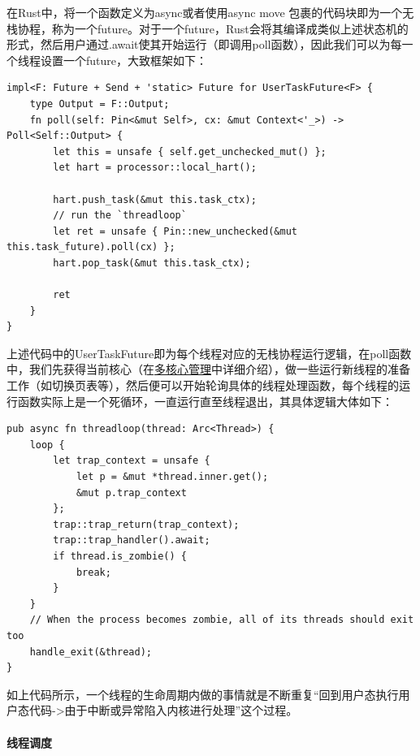 在Rust中，将一个函数定义为async或者使用async move {}包裹的代码块即为一个无栈协程，称为一个future。对于一个future，Rust会将其编译成类似上述状态机的形式，然后用户通过.await使其开始运行（即调用poll函数），因此我们可以为每一个线程设置一个future，大致框架如下：

\begin{tcolorbox}[
title=\textbf{os/src/process/thread/schedule.rs},
listing only,
breakable
]
    \begin{verbatim}
impl<F: Future + Send + 'static> Future for UserTaskFuture<F> {
    type Output = F::Output;
    fn poll(self: Pin<&mut Self>, cx: &mut Context<'_>) -> Poll<Self::Output> {
        let this = unsafe { self.get_unchecked_mut() };
        let hart = processor::local_hart();
        
        hart.push_task(&mut this.task_ctx);
        // run the `threadloop`
        let ret = unsafe { Pin::new_unchecked(&mut this.task_future).poll(cx) };
        hart.pop_task(&mut this.task_ctx);
        
        ret
    }
}
    \end{verbatim}
\end{tcolorbox}

上述代码中的UserTaskFuture即为每个线程对应的无栈协程运行逻辑，在poll函数中，我们先获得当前核心（在\hyperref[multiharts]{多核心管理}中详细介绍），做一些运行新线程的准备工作（如切换页表等），然后便可以开始轮询具体的线程处理函数，每个线程的运行函数实际上是一个死循环，一直运行直至线程退出，其具体逻辑大体如下：
\begin{tcolorbox}[
title=\textbf{os/src/process/thread/threaloop.rs},
listing only,
breakable
]
    \begin{verbatim}
pub async fn threadloop(thread: Arc<Thread>) {
    loop {
        let trap_context = unsafe {
            let p = &mut *thread.inner.get();
            &mut p.trap_context
        };
        trap::trap_return(trap_context);
        trap::trap_handler().await;
        if thread.is_zombie() {
            break;
        }
    }
    // When the process becomes zombie, all of its threads should exit too
    handle_exit(&thread);
}
    \end{verbatim}
\end{tcolorbox}

如上代码所示，一个线程的生命周期内做的事情就是不断重复“回到用户态执行用户态代码->由于中断或异常陷入内核进行处理”这个过程。

\paragraph{线程调度}~{}

